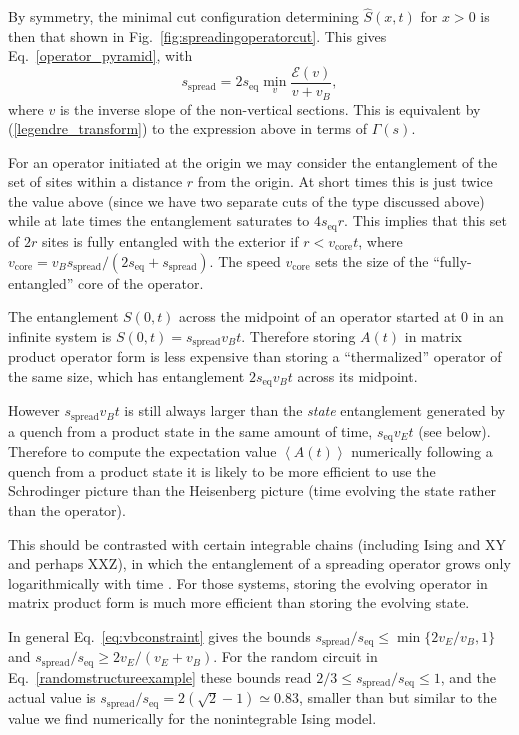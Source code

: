 \documentclass[aps,prx,twocolumn,superscriptaddress,floatfix,nofootinbib,prx]{revtex4}
\newcommand{\f}{\frac}
\renewcommand{\>}{\right\rangle}
\newcommand{\<}{\left\langle}
\newcommand{\be}{\begin{equation}}
\newcommand{\ee}{\end{equation}}
\newcommand{\blue}{}
\newcommand{\sspr}{s_\text{spread}}
\newcommand{\seq}{s_\text{eq}}
\newcommand{\lt}{\mathcal{E}}
\begin{document}
By symmetry, the minimal cut configuration determining $\hat S(x,t)$ for $x>0$ is then that shown in  Fig.~\ref{fig:spreadingoperatorcut}. This gives
Eq.~\ref{operator_pyramid}, with 
\be\label{spreadingoperatorminimization}
\sspr = 2 \seq \min_v \f{\lt(v)}{v+v_B},
\ee
where $v$ is the inverse slope of the non-vertical sections.
This is  equivalent by (\ref{legendre_transform}) to the expression above in terms of $\Gamma(s)$.

For an operator initiated at the origin we may consider the entanglement of the set of sites within a distance $r$ from the origin.  At short times this is just twice the value above (since we have two separate cuts of the type discussed above) while at late times the entanglement saturates to {\blue $4\seq r$}. This implies that this set of $2r$ sites is fully entangled with the exterior if ${r<v_\text{core} t}$, where {\blue $v_\text{core} = v_B \sspr/(2 s_\text{eq}+\sspr)$}. The speed $v_\text{core}$ sets the size of the ``fully-entangled'' core of the operator. 

The entanglement $S(0,t)$ across the midpoint of an operator started at 0 in an infinite system is ${S(0,t)=\sspr v_B t}$. 
Therefore storing $A(t)$ in matrix product operator form is less expensive than storing a ``thermalized'' operator of the same size, which has entanglement  $2 \seq v_B t$ across its midpoint. 

However $\sspr v_B t$ is still always larger than the \textit{state} entanglement generated by a quench from a product state in the same amount of time, $\seq v_E t$ (see below). Therefore to compute the expectation value $\<A(t)\>$ numerically following a quench from a product state it is likely to be more efficient to use the Schrodinger picture than the Heisenberg picture (time evolving the state rather than the operator). 

This should be contrasted with certain integrable chains (including Ising and XY and perhaps XXZ), in which  the entanglement of a spreading operator grows only logarithmically with time \cite{prosenpizorn, prosenpizorn2,dubail}. For those systems, storing the evolving operator in matrix product form is much more efficient than storing the evolving state.


In general Eq.~\ref{eq:vbconstraint} gives the bounds $\sspr /  \seq \leq \min \{ 2 v_E/v_B, 1\}$ and $\sspr/ \seq \geq 2 v_E / (v_E + v_B)$. For the random circuit in Eq.~\ref{randomstructureexample} these bounds read $2/3 \leq \sspr /  \seq \leq 1$, and the actual value  is $\sspr/\seq  = 2 (\sqrt 2 - 1)\simeq 0.83$,  smaller than but similar to the value  we find numerically for the nonintegrable Ising model.
\end{document}
